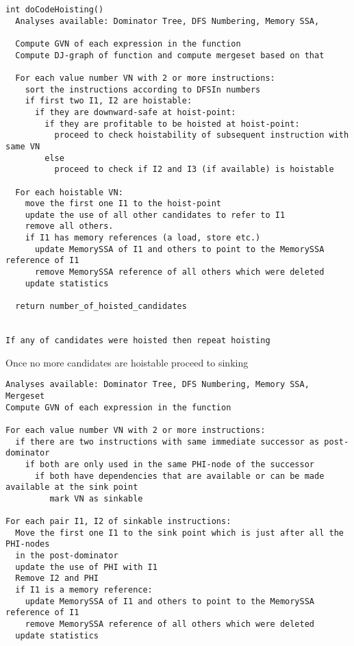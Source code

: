 \documentclass[acmlarge,review,anonymous]{acmart}\settopmatter{printfolios=true}
\begin{document}
\begin{verbatim}
int doCodeHoisting()
  Analyses available: Dominator Tree, DFS Numbering, Memory SSA,

  Compute GVN of each expression in the function
  Compute DJ-graph of function and compute mergeset based on that

  For each value number VN with 2 or more instructions:
    sort the instructions according to DFSIn numbers
    if first two I1, I2 are hoistable:
      if they are downward-safe at hoist-point:
        if they are profitable to be hoisted at hoist-point:
          proceed to check hoistability of subsequent instruction with same VN
        else
          proceed to check if I2 and I3 (if available) is hoistable

  For each hoistable VN:
    move the first one I1 to the hoist-point
    update the use of all other candidates to refer to I1
    remove all others.
    if I1 has memory references (a load, store etc.)
      update MemorySSA of I1 and others to point to the MemorySSA reference of I1
      remove MemorySSA reference of all others which were deleted
    update statistics

  return number_of_hoisted_candidates


If any of candidates were hoisted then repeat hoisting
\end{verbatim}

Once no more candidates are hoistable proceed to sinking

\begin{verbatim}
Analyses available: Dominator Tree, DFS Numbering, Memory SSA, Mergeset
Compute GVN of each expression in the function

For each value number VN with 2 or more instructions:
  if there are two instructions with same immediate successor as post-dominator
    if both are only used in the same PHI-node of the successor
      if both have dependencies that are available or can be made available at the sink point
         mark VN as sinkable

For each pair I1, I2 of sinkable instructions:
  Move the first one I1 to the sink point which is just after all the PHI-nodes
  in the post-dominator
  update the use of PHI with I1
  Remove I2 and PHI
  if I1 is a memory reference:
    update MemorySSA of I1 and others to point to the MemorySSA reference of I1
    remove MemorySSA reference of all others which were deleted
  update statistics

\end{verbatim}
\end{document}
